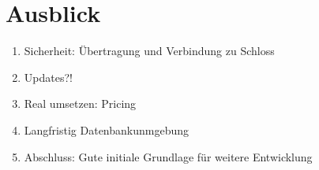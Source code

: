 
\chapter{Ausblick}
\begin{enumerate}
    \item Sicherheit: Übertragung und Verbindung zu Schloss
    \item Updates?!
    \item Real umsetzen: Pricing
    \item Langfristig Datenbankunmgebung
    \item Abschluss: Gute initiale Grundlage für weitere Entwicklung
\end{enumerate}